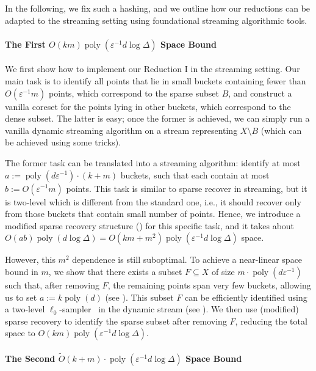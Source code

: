 \documentclass[letterpaper,11pt]{article}
\theoremstyle{plain}
\theoremstyle{definition}
\theoremstyle{remark}
\DeclareMathOperator{\poly}{poly}
\newcommand{\eps}{\varepsilon}
\renewcommand{\epsilon}{\varepsilon}
\begin{document}
In the following, we fix such a hashing, and we outline how our reductions can be adapted to the streaming setting using foundational streaming algorithmic tools.

\paragraph{The First $O(km)\poly(\eps^{-1}d\log\Delta)$ Space Bound} 
We first show how to implement our Reduction I in the streaming setting. Our main task is to identify all points that lie in small buckets containing fewer than $O(\epsilon^{-1}m)$ points, which correspond to the sparse subset $B$, and construct a vanilla coreset for the points lying in other buckets, which correspond to the dense subset. The latter is easy; once the former is achieved, we can simply run a vanilla dynamic streaming algorithm on a stream representing $X \setminus B$ (which can be achieved using some tricks).

The former task can be translated into a streaming algorithm:
identify at most $a := \poly(d\epsilon^{-1}) \cdot (k  + m)$ buckets,
such that each contain at most $b := O(\eps^{-1}m)$ points.
This task is similar to sparse recover in streaming, but it is two-level which is different from the standard one, i.e., it should recover only from those buckets that contain small number of points.
Hence, we introduce a modified sparse recovery structure () for this specific task, and it takes about $O(ab)\poly(d\log\Delta) = O(km+m^2) \poly(\epsilon^{-1}d\log\Delta)$ space. 

However, this $m^2$ dependence is still suboptimal. 
To achieve a near-linear space bound in $m$, we show that there exists a subset $F \subseteq X$ of size $m \cdot \poly(d \eps^{-1})$ such that, after removing $F$, the remaining points span very few buckets, allowing us to set $a:=k\poly(d)$ (see ). This subset $F$ can be efficiently identified using a two-level $\ell_0$-sampler~\cite[Lemma 3.3]{arxiv.2204.02095} in the dynamic stream (see ). We then use (modified) sparse recovery to identify the sparse subset after removing $F$, reducing the total space to $O(km)\poly(\eps^{-1}d\log\Delta)$.

\paragraph{The Second $\tilde{O}(k+m)\cdot \poly(\eps^{-1}d\log\Delta)$ Space Bound}
\end{document}
